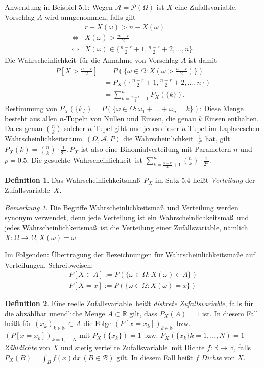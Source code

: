 \documentclass[a4paper,12pt,fleqn]{scrartcl}
\newcommand{\N}{\mathbb{N}}
\newcommand{\R}{\mathbb{R}}
\newcommand{\m}[1]{\mathcal{ #1 }}
\newcommand{\WR}{Wahrscheinlichkeitsraum}
\newcommand{\WM}{Wahrscheinlichkeitsmaß}
\newcommand{\Wk}{Wahrscheinlichkeit}
\newcommand{\ZV}{Zufallsvariable}
\theoremstyle{definition}
\newtheorem{definition}{Definition}[section]
\theoremstyle{plain}
\theoremstyle{remark}
\newtheorem*{bemerkung}{Bemerkung}
\begin{document}
Anwendung in Beispiel 5.1: Wegen $\m{A} = \m{P}( \Omega) $ ist $X$ eine \ZV. Vorschlag $A$ wird anngenommen, falls gilt
\begin{align*}
&r + X(\omega) > n - X( \omega ) \\
\Leftrightarrow &X( \omega) > \frac{n-r}{2} \\
\Leftrightarrow &X( \omega) \in \{ \frac{n-r}{2}+1,\frac{n-r}{2}+2, \ldots ,n \}.
\end{align*}  
Die \Wk \, für die Annahme von Vorschlag $A$ ist damit 
\begin{align*}
P[X > \frac{n-r}{2} ] &= P( \{ \omega \in \Omega : X( \omega >  \frac{n-r}{2})\}) \\
&= P_X( \{ \frac{n-r}{2}+1,\frac{n-r}{2}+2, \ldots ,n \} ) \\
&= \sum_{k = \frac{n-r}{2}+1}^n {P_X( \{ k \} )}.
\end{align*}  
Bestimmung von $P_X( \{ k \} ) = P( \{ \omega \in \Omega : \omega_1 + ... + \omega_n = k \} )$:  Diese Menge besteht aus allen $n$-Tupeln von Nullen und Einsen, die genau $k$ Einsen enthalten. Da es genau  $\binom{n}{k}$ solcher $n$-Tupel gibt und jedes dieser $n$-Tupel im Laplaceschen \WR \, $( \Omega , \m{A} , P)$ die \Wk \, $\frac{1}{2^n}$ hat, gilt $P_X(k) = \binom{n}{k} \cdot \frac{1}{2^n}. \, P_X$  ist also eine Binomialverteilung mit Parametern $n$ und $p = 0.5$. Die gesuchte \Wk \, ist $\sum_{k= \frac{n-r}{2} +1}^n{\binom{n}{k} \cdot \frac{1}{2^n}}$.
\begin{definition}
Das \WM \, $P_X$ im Satz 5.4 heißt \emph{Verteilung} der \ZV \, $X$.
\end{definition}
\begin{bemerkung}
Die Begriffe \WM \, und Verteilung werden synonym verwendet, denn jede Verteilung ist ein \WM \, und jedes \WM \, ist die Verteilung einer \ZV, nämlich $X: \Omega \rightarrow \Omega, X( \omega) = \omega $.
\end{bemerkung}
Im Folgenden: Übertragung der Bezeichnungen für \WM e auf Verteilungen. Schreibweisen: 
\begin{align*}
P[X \in A] := P( \{ \omega \in \Omega : X(\omega ) \in A \} ) \\
P[X = x] := P( \{ \omega \in \Omega : X(\omega ) = x \} )
\end{align*}
\begin{definition}
Eine reelle \ZV \, heißt \emph{diskrete \ZV}, falls für die abzählbar unendliche Menge $ A \subset \R $ gilt, dass $ P_X(A) = 1 $ ist. In diesem Fall heißt für $(x_k)_{k \in \N } \subset A $ die Folge $ (P[x = x_k])_{k \in \N } $ bzw. $(P[x = x_k])_{k = 1,...,N } $ mit $P_X( \{ x_k \} ) = 1$ bzw. $P_X( \{ x_k \} k = 1,...,N ) = 1$ \emph{Zähldichte} von $X$ und stetig verteilte \ZV \, mit Dichte $ f: \R \rightarrow \R $, falls $ P_X(B) = \int_B f(x) \mathrm{d}x \, ( B \in \m{B} ) $ gilt. In diesem Fall heißt $f$ \emph{Dichte} von $X$. 
\end{definition}
\end{document}
